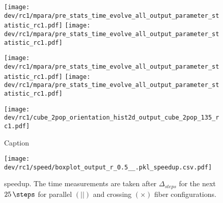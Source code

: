 %
\begin{sidewaysfigure}[!h]
\centering
\texttt{[image: dev/rc1/mpara/pre\_stats\_time\_evolve\_all\_output\_parameter\_statistic\_rc1.pdf]}
\texttt{[image: dev/rc1/mpara/pre\_stats\_time\_evolve\_all\_output\_parameter\_statistic\_rc1.pdf]}
\label{app:pste4}
\end{sidewaysfigure}
%
\begin{sidewaysfigure}[!h]
\centering
\texttt{[image: dev/rc1/mpara/pre\_stats\_time\_evolve\_all\_output\_parameter\_statistic\_rc1.pdf]}
\texttt{[image: dev/rc1/mpara/pre\_stats\_time\_evolve\_all\_output\_parameter\_statistic\_rc1.pdf]}
\label{app:pste5}
\end{sidewaysfigure}
%
%
% 
%
\begin{figure}[!h]
    \centering
    \texttt{[image: dev/rc1/cube\_2pop\_orientation\_hist2d\_output\_cube\_2pop\_135\_rc1.pdf]}
    \caption{Caption}
    \label{app:modelHistOrientation}
\end{figure}
%
% 
% 
%
\begin{figure}[!h]
\centering
\texttt{[image: dev/rc1/speed/boxplot\_output\_r\_0.5\_\_.pkl\_speedup.csv.pdf]}
\caption[ speedup]{ speedup. The time measurements are taken after $\Delta_{\mathit{steps}}$ for the next $\SI{25}{\steps}$ for parallel $(||)$ and crossing $(\times)$ fiber configurations.}
\label{app:solverSpeedupAll}
\end{figure}
%
%
%
